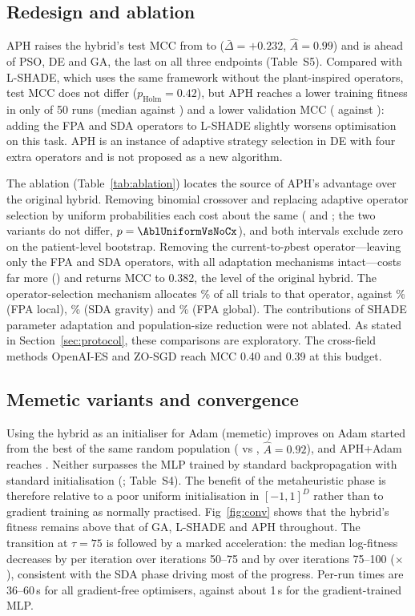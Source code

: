 \documentclass[preprint,12pt]{elsarticle}
\begin{document}
\subsection{Redesign and ablation}\label{sec:redesign}
APH raises the hybrid's test MCC from \MCCHybrid{} to \MCCAph{} ($\bar\Delta=+0.232$, $\hat A=0.99$) and is ahead of PSO, DE and GA, the last on all three endpoints (Table~S5). Compared with L-SHADE, which uses the same framework without the plant-inspired operators, test MCC does not differ ($p_{\mathrm{Holm}}=0.42$), but APH reaches a lower training fitness in only \WinFitAphlShade{} of 50 runs (median \FitAph{} against \FitLshade) and a lower validation MCC (\ValAph{} against \ValLshade): adding the FPA and SDA operators to L-SHADE slightly worsens optimisation on this task. APH is an instance of adaptive strategy selection in DE \citep{qin2009sade,gong2011strategy} with four extra operators and is not proposed as a new algorithm.

The ablation (Table~\ref{tab:ablation}) locates the source of APH's advantage over the original hybrid. Removing binomial crossover and replacing adaptive operator selection by uniform probabilities each cost about the same (\AblNoCx{} and \AblUniform; the two variants do not differ, $p=\AblUniformVsNoCx$), and both intervals exclude zero on the patient-level bootstrap. Removing the current-to-$p$best operator---leaving only the FPA and SDA operators, with all adaptation mechanisms intact---costs far more (\AblPlant) and returns MCC to 0.382, the level of the original hybrid. The operator-selection mechanism allocates \ShareAnimal\% of all trials to that operator, against \ShareLocal\% (FPA local), \ShareGravity\% (SDA gravity) and \ShareGlobal\% (FPA global). The contributions of SHADE parameter adaptation and population-size reduction were not ablated. As stated in Section~\ref{sec:protocol}, these comparisons are exploratory. The cross-field methods OpenAI-ES and ZO-SGD reach MCC 0.40 and 0.39 at this budget.



\subsection{Memetic variants and convergence}
Using the hybrid as an initialiser for Adam (memetic) improves on Adam started from the best of the same random population (\MCCMemeticHybrid{} vs \MCCAdamOnly, $\hat A=0.92$), and APH+Adam reaches \MCCMemeticAph. Neither surpasses the MLP trained by standard backpropagation with standard initialisation (\MCCMlpAdam; Table~S4). The benefit of the metaheuristic phase is therefore relative to a poor uniform initialisation in $[-1,1]^D$ rather than to gradient training as normally practised. Fig~\ref{fig:conv} shows that the hybrid's fitness remains above that of GA, L-SHADE and APH throughout. The transition at $\tau=75$ is followed by a marked acceleration: the median log-fitness decreases by \SlopePre{} per iteration over iterations 50--75 and by \SlopePost{} over iterations 75--100 (\SlopeRatio$\times$), consistent with the SDA phase driving most of the progress. Per-run times are 36--60\,s for all gradient-free optimisers, against about 1\,s for the gradient-trained MLP.
\end{document}
